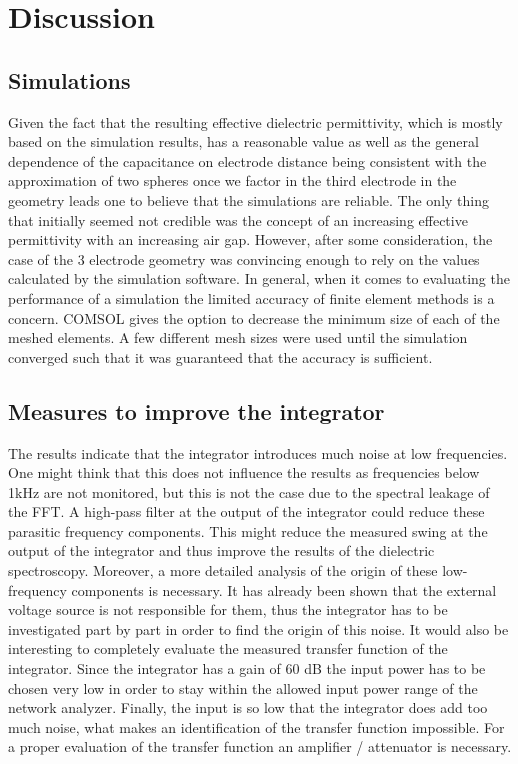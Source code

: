 \chapter{Discussion}

\section{Simulations}
Given the fact that the resulting effective dielectric permittivity, which
is mostly based on the simulation results, has 
a reasonable value as well as the general dependence of the capacitance on electrode distance being consistent
with the approximation of two spheres once we factor in the third electrode in the geometry leads one 
to believe that the simulations are reliable. 
\newline
The only thing that initially seemed not credible was the concept of an increasing effective permittivity
with an increasing air gap. However, after some consideration, the case of the 3 electrode geometry was convincing enough to rely
on the values calculated by the simulation software. 
\newline
In general, when it comes to evaluating the performance of a simulation the limited accuracy
of finite element methods is a concern. COMSOL gives the option to decrease the minimum size of each of the meshed elements.
A few different mesh sizes were used until the simulation converged such that it was guaranteed that the accuracy is sufficient. 

\section{Measures to improve the integrator}
The results indicate that the integrator introduces much noise at low frequencies. One might think that this does not influence the results as frequencies below 1kHz are not monitored, but this is not the case due to the spectral leakage of the FFT.  A high-pass filter at the output of the integrator could reduce these parasitic frequency components. This might reduce the measured swing at the output of the integrator and thus improve the results of the dielectric spectroscopy. 
Moreover, a more detailed analysis of the origin of these low-frequency components is necessary. It has already been shown that the external voltage source is not responsible for them, thus the integrator has to be investigated part by part in order to find the origin of this noise. 
It would also be interesting to completely evaluate the measured transfer function of the integrator. Since the integrator has a gain of 60 dB the input power has to be chosen very low in order to stay within the allowed input power range of the network analyzer. Finally, the input is so low that the integrator does add too much noise, what makes an identification of the transfer function impossible. For a proper evaluation of the transfer function an amplifier / attenuator is necessary. 

